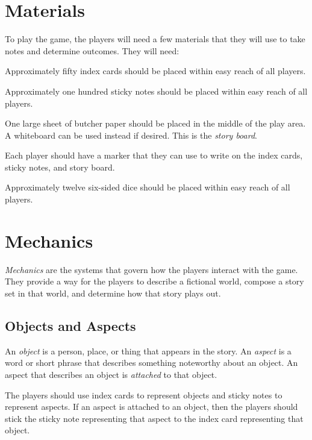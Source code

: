 \documentclass[12pt, a5paper, parskip=half-]{scrartcl}
\begin{document}
\section*{Materials}
To play the game, the players will need a few materials that they will use to take notes and determine outcomes. 
They will need:
\begin{description}[labelindent=0.25cm, leftmargin=\widthof{\hspace{0.25cm}\textbullet\space}, font=\normalfont\textbullet\bfseries\space]
	\item[Index Cards] Approximately fifty index cards should be placed within easy reach of all players. 
	\item[Sticky Notes] Approximately one hundred sticky notes should be placed within easy reach of all players.
	\item[Butcher Paper]	 One large sheet of butcher paper should be placed in the middle of the play area.  A whiteboard can be used instead if desired. This is the \emph{story board}. %
	\item[Markers] Each player should have a marker that they can use to write on the index cards, sticky notes, and story board.
	\item[Dice] Approximately twelve six-sided dice should be placed within easy reach of all players. 
\end{description}

\newpage

\section*{Mechanics}    
\emph{Mechanics} are the systems that govern how the players interact with the game.
They provide a way for the players to describe a fictional world, compose a story set in that world, and determine how that story plays out.

\subsection*{Objects and Aspects}
An \emph{object} is a person, place, or thing that appears in the story.
An \emph{aspect} is a word or short phrase that describes something noteworthy about an object.
An aspect that describes an object is \emph{attached} to that object.

The players should use index cards to represent objects and sticky notes to represent aspects. 
If an aspect is attached to an object, then the players should stick the sticky note representing that aspect to the index card representing that object.
\end{document}
